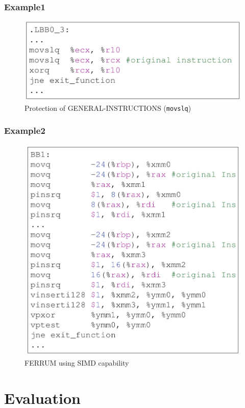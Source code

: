\documentclass[
	12pt, %
]{beamer}
\begin{document}
\begin{frame}
	\frametitle{Example1}
	
	\begin{figure}
		\centering
		\includegraphics[width=0.8\linewidth]{Images/img11}
		\caption{Protection of GENERAL-INSTRUCTIONS (\texttt{movslq})}
		\label{fig:Protection of G ENERAL - INSTRUCTIONS}
	\end{figure}
	
\end{frame}


\begin{frame}
	\frametitle{Example2}
	
	\begin{figure}
		\centering
		\includegraphics[width=0.6\linewidth]{Images/img12}
		\caption{FERRUM using SIMD capability}
		\label{fig:FERRUM using SIMD capability}
	\end{figure}
	
\end{frame}








\section{Evaluation}
\end{document}
